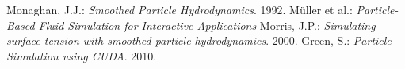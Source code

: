\documentclass[a4paper,report]{IEEEtran}
\begin{document}

%
%
%
\begin{thebibliography}{1}


	Monaghan, J.J.: \emph{Smoothed Particle Hydrodynamics}. 1992.
	Müller et al.: \emph{Particle-Based Fluid Simulation for Interactive Applications}
	Morris, J.P.: \emph{Simulating surface tension with smoothed particle hydrodynamics}. 2000.
	Green, S.: \emph{Particle Simulation using CUDA}. 2010.

\end{thebibliography}




\end{document}
